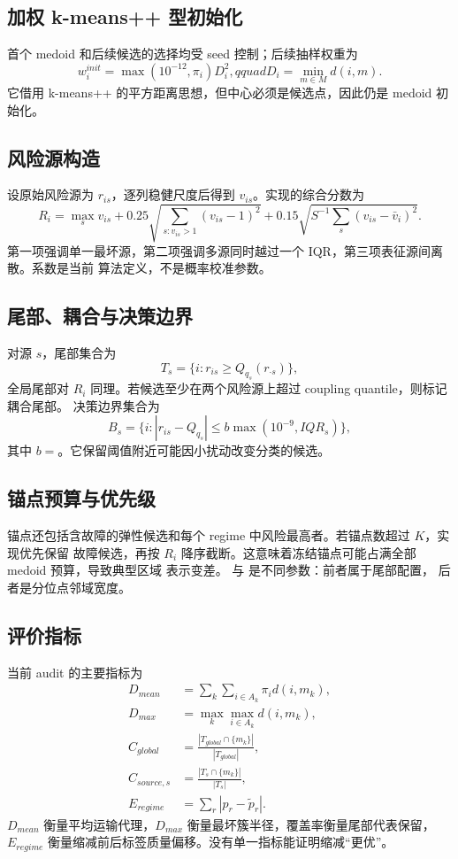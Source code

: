 \subsection{加权 k-means++ 型初始化}
首个 medoid 和后续候选的选择均受 seed 控制；后续抽样权重为
\begin{equation}
 w_i^{init}=\max(10^{-12},\pi_i)D_i^2,qquad
 D_i=\min_{m\in M}d(i,m).
\end{equation}
它借用 k-means++ 的平方距离思想，但中心必须是候选点，因此仍是 medoid 初始化。

\subsection{风险源构造}
设原始风险源为 $r_{is}$，逐列稳健尺度后得到 $v_{is}$。实现的综合分数为
\begin{equation}
 R_i=\max_s v_{is}
 +0.25\sqrt{\sum_{s:v_{is}>1}(v_{is}-1)^2}
 +0.15\sqrt{S^{-1}\sum_s(v_{is}-\bar v_i)^2}.
\end{equation}
第一项强调单一最坏源，第二项强调多源同时越过一个 IQR，第三项表征源间离散。系数是当前
算法定义，不是概率校准参数。

\subsection{尾部、耦合与决策边界}
对源 $s$，尾部集合为
\begin{equation}
 T_s=\{i:r_{is}\ge Q_{q_s}(r_{\cdot s})\},
\end{equation}
全局尾部对 $R_i$ 同理。若候选至少在两个风险源上超过 coupling quantile，则标记耦合尾部。
决策边界集合为
\begin{equation}
 B_s=\{i:|r_{is}-Q_{q_s}|\le b\max(10^{-9},IQR_s)\},
\end{equation}
其中 $b=$。它保留阈值附近可能因小扰动改变分类的候选。

\subsection{锚点预算与优先级}
锚点还包括含故障的弹性候选和每个 regime 中风险最高者。若锚点数超过 $K$，实现优先保留
故障候选，再按 $R_i$ 降序截断。这意味着冻结锚点可能占满全部 medoid 预算，导致典型区域
表示变差。 与  是不同参数：前者属于尾部配置，
后者是分位点邻域宽度。

\subsection{评价指标}
当前 audit 的主要指标为
\begin{align}
 D_{mean}&=\sum_k\sum_{i\in A_k}\pi_i d(i,m_k),\\
 D_{max}&=\max_k\max_{i\in A_k}d(i,m_k),\\
 C_{global}&=\frac{|T_{global}\cap\{m_k\}|}{|T_{global}|},\\
 C_{source,s}&=\frac{|T_s\cap\{m_k\}|}{|T_s|},\\
 E_{regime}&=\sum_r|p_r-\widetilde p_r|.
\end{align}
$D_{mean}$ 衡量平均运输代理，$D_{max}$ 衡量最坏簇半径，覆盖率衡量尾部代表保留，
$E_{regime}$ 衡量缩减前后标签质量偏移。没有单一指标能证明缩减“更优”。

